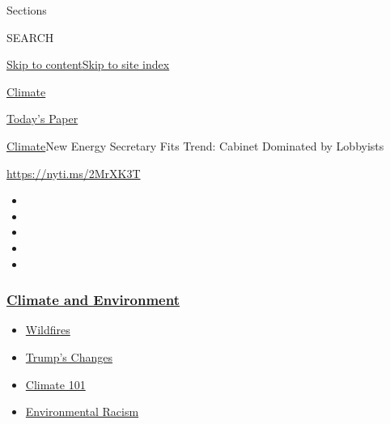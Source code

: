 Sections

SEARCH

\protect\hyperlink{site-content}{Skip to
content}\protect\hyperlink{site-index}{Skip to site index}

\href{https://www.nytimes3xbfgragh.onion/section/climate}{Climate}

\href{https://myaccount.nytimes3xbfgragh.onion/auth/login?response_type=cookie\&client_id=vi}{}

\href{https://www.nytimes3xbfgragh.onion/section/todayspaper}{Today's
Paper}

\href{/section/climate}{Climate}\textbar{}New Energy Secretary Fits
Trend: Cabinet Dominated by Lobbyists

\url{https://nyti.ms/2MrXK3T}

\begin{itemize}
\item
\item
\item
\item
\item
\end{itemize}

\hypertarget{climate-and-environment}{%
\subsubsection{\texorpdfstring{\href{https://www.nytimes3xbfgragh.onion/section/climate?name=styln-climate\&region=TOP_BANNER\&block=storyline_menu_recirc\&action=click\&pgtype=Article\&impression_id=18654160-f4d2-11ea-a147-e379c6aa6545\&variant=undefined}{Climate
and
Environment}}{Climate and Environment}}\label{climate-and-environment}}

\begin{itemize}
\tightlist
\item
  \href{https://www.nytimes3xbfgragh.onion/2020/09/08/climate/california-wildfires-climate.html?name=styln-climate\&region=TOP_BANNER\&block=storyline_menu_recirc\&action=click\&pgtype=Article\&impression_id=18654161-f4d2-11ea-a147-e379c6aa6545\&variant=undefined}{Wildfires}
\item
  \href{https://www.nytimes3xbfgragh.onion/interactive/2020/climate/trump-environment-rollbacks.html?name=styln-climate\&region=TOP_BANNER\&block=storyline_menu_recirc\&action=click\&pgtype=Article\&impression_id=18654162-f4d2-11ea-a147-e379c6aa6545\&variant=undefined}{Trump's
  Changes}
\item
  \href{https://www.nytimes3xbfgragh.onion/interactive/2020/04/19/climate/climate-crash-course-1.html?name=styln-climate\&region=TOP_BANNER\&block=storyline_menu_recirc\&action=click\&pgtype=Article\&impression_id=18654163-f4d2-11ea-a147-e379c6aa6545\&variant=undefined}{Climate
  101}
\item
  \href{https://www.nytimes3xbfgragh.onion/interactive/2020/08/24/climate/racism-redlining-cities-global-warming.html?name=styln-climate\&region=TOP_BANNER\&block=storyline_menu_recirc\&action=click\&pgtype=Article\&impression_id=18656870-f4d2-11ea-a147-e379c6aa6545\&variant=undefined}{Environmental
  Racism}
\end{itemize}

